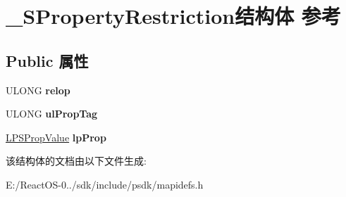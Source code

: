 \hypertarget{struct___s_property_restriction}{}\section{\+\_\+\+S\+Property\+Restriction结构体 参考}
\label{struct___s_property_restriction}
\subsection*{Public 属性}
\begin{DoxyCompactItemize}
\item 
\mbox{\label{struct___s_property_restriction_ada1fbb756d5fa3030ff70a904d01f35d}} 
U\+L\+O\+NG {\bfseries relop}
\item 
\mbox{\label{struct___s_property_restriction_ad31f83b41e63ad69d7ac2734630a5267}} 
U\+L\+O\+NG {\bfseries ul\+Prop\+Tag}
\item 
\mbox{\label{struct___s_property_restriction_a63d2e7f15e30217117887d692ed91bde}} 
\hyperlink{struct___s_prop_value}{L\+P\+S\+Prop\+Value} {\bfseries lp\+Prop}
\end{DoxyCompactItemize}


该结构体的文档由以下文件生成\+:\begin{DoxyCompactItemize}
\item 
E\+:/\+React\+O\+S-\/0../sdk/include/psdk/mapidefs.\+h\end{DoxyCompactItemize}
